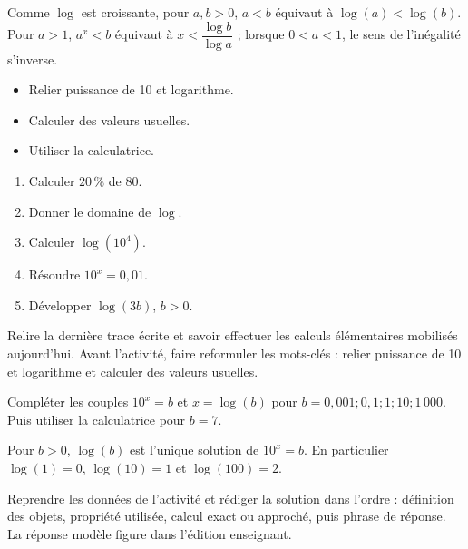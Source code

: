 Comme $\log$ est croissante, pour $a,b>0$, $a<b$ équivaut à $\log(a)<\log(b)$. Pour $a>1$, $a^x<b$ équivaut à $x<\dfrac{\log b}{\log a}$ ; lorsque $0<a<1$, le sens de l'inégalité s'inverse.

\begin{objectifs}\begin{itemize}\item Relier puissance de 10 et logarithme.\item Calculer des valeurs usuelles.\item Utiliser la calculatrice.\end{itemize}\end{objectifs}
\begin{automatismes}\begin{enumerate}\item Calculer $20\,\%$ de $80$. \item Donner le domaine de $\log$. \rep{$]0,+\infty[$}\item Calculer $\log(10^4)$. \item Résoudre $10^x=0{,}01$. \item Développer $\log(3b)$, $b>0$. \end{enumerate}\end{automatismes}
\begin{prerequis}Relire la dernière trace écrite et savoir effectuer les calculs élémentaires mobilisés aujourd'hui. Avant l'activité, faire reformuler les mots-clés : relier puissance de 10 et logarithme et calculer des valeurs usuelles.\end{prerequis}

\begin{activite}
Compléter les couples $10^x=b$ et $x=\log(b)$ pour $b=0{,}001;0{,}1;1;10;1\,000$. Puis utiliser la calculatrice pour $b=7$.

\end{activite}

\begin{traceecrite}Pour $b>0$, $\log(b)$ est l'unique solution de $10^x=b$. En particulier $\log(1)=0$, $\log(10)=1$ et $\log(100)=2$.\end{traceecrite}

\begin{exemple}
Reprendre les données de l'activité et rédiger la solution dans l'ordre : définition des objets, propriété utilisée, calcul exact ou approché, puis phrase de réponse. La réponse modèle figure dans l'édition enseignant.
\end{exemple}

